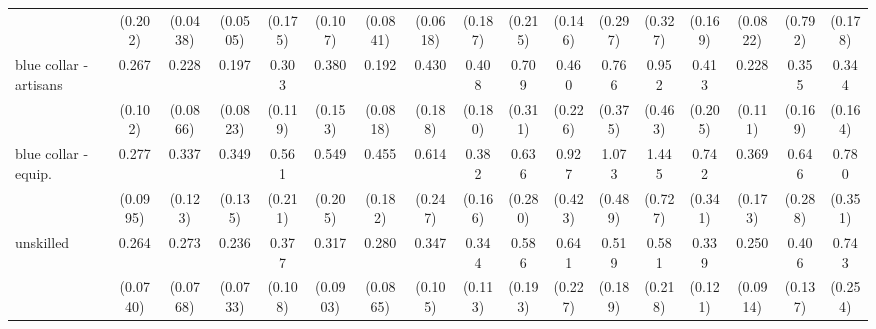 {\begin{tabular}{l*{16}{c}}
                    &     (0.202)         &    (0.0438)         &    (0.0505)         &     (0.175)         &     (0.107)         &    (0.0841)         &    (0.0618)         &     (0.187)         &     (0.215)         &     (0.146)         &     (0.297)         &     (0.327)         &     (0.169)         &    (0.0822)         &     (0.792)         &     (0.178)         \\
[1em]
blue collar - artisans&       0.267\sym{***}&       0.228\sym{***}&       0.197\sym{***}&       0.303\sym{**} &       0.380\sym{*}  &       0.192\sym{***}&       0.430         &       0.408\sym{*}  &       0.709         &       0.460         &       0.766         &       0.952         &       0.413         &       0.228\sym{**} &       0.355\sym{*}  &       0.344\sym{*}  \\
                    &     (0.102)         &    (0.0866)         &    (0.0823)         &     (0.119)         &     (0.153)         &    (0.0818)         &     (0.188)         &     (0.180)         &     (0.311)         &     (0.226)         &     (0.375)         &     (0.463)         &     (0.205)         &     (0.111)         &     (0.169)         &     (0.164)         \\
[1em]
blue collar - equip.&       0.277\sym{***}&       0.337\sym{**} &       0.349\sym{**} &       0.561         &       0.549         &       0.455\sym{*}  &       0.614         &       0.382\sym{*}  &       0.636         &       0.927         &       1.073         &       1.445         &       0.742         &       0.369\sym{*}  &       0.646         &       0.780         \\
                    &    (0.0995)         &     (0.123)         &     (0.135)         &     (0.211)         &     (0.205)         &     (0.182)         &     (0.247)         &     (0.166)         &     (0.280)         &     (0.423)         &     (0.489)         &     (0.727)         &     (0.341)         &     (0.173)         &     (0.288)         &     (0.351)         \\
[1em]
unskilled           &       0.264\sym{***}&       0.273\sym{***}&       0.236\sym{***}&       0.377\sym{***}&       0.317\sym{***}&       0.280\sym{***}&       0.347\sym{***}&       0.344\sym{**} &       0.586         &       0.641         &       0.519         &       0.581         &       0.339\sym{**} &       0.250\sym{***}&       0.406\sym{**} &       0.743         \\
                    &    (0.0740)         &    (0.0768)         &    (0.0733)         &     (0.108)         &    (0.0903)         &    (0.0865)         &     (0.105)         &     (0.113)         &     (0.193)         &     (0.227)         &     (0.189)         &     (0.218)         &     (0.121)         &    (0.0914)         &     (0.137)         &     (0.254)         \\

\end{tabular}}

